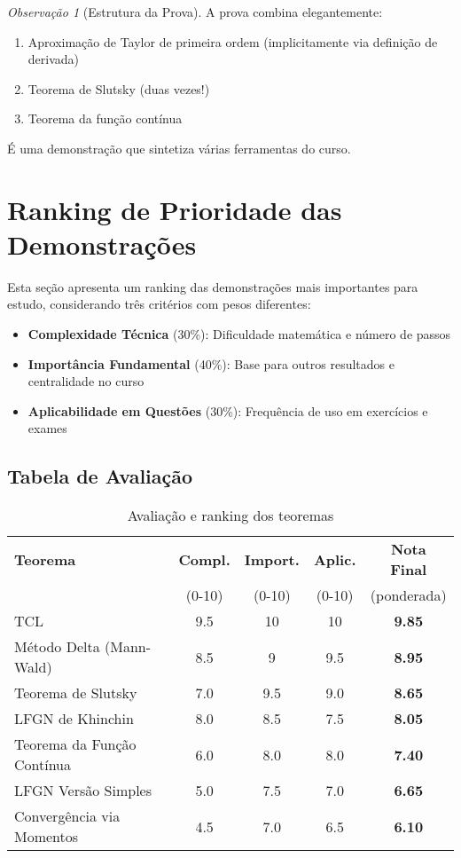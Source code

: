 \documentclass[12pt,a4paper]{article}
\theoremstyle{plain}
\theoremstyle{definition}
\theoremstyle{remark}
\newtheorem{observacao}[teorema]{Observação}
\begin{document}
\begin{observacao}[Estrutura da Prova]
A prova combina elegantemente:
\begin{enumerate}
    \item Aproximação de Taylor de primeira ordem (implicitamente via definição de derivada)
    \item Teorema de Slutsky (duas vezes!)
    \item Teorema da função contínua
\end{enumerate}
É uma demonstração que sintetiza várias ferramentas do curso.
\end{observacao}

\newpage
\section{Ranking de Prioridade das Demonstrações}

Esta seção apresenta um ranking das demonstrações mais importantes para estudo, considerando três critérios com pesos diferentes:
\begin{itemize}
    \item \textbf{Complexidade Técnica} (30\%): Dificuldade matemática e número de passos
    \item \textbf{Importância Fundamental} (40\%): Base para outros resultados e centralidade no curso
    \item \textbf{Aplicabilidade em Questões} (30\%): Frequência de uso em exercícios e exames
\end{itemize}

\subsection{Tabela de Avaliação}

\begin{table}[h]
\centering
\begin{tabular}{|l|c|c|c|c|}
\hline
\textbf{Teorema} & \textbf{Compl.} & \textbf{Import.} & \textbf{Aplic.} & \textbf{Nota Final} \\
 & (0-10) & (0-10) & (0-10) & (ponderada) \\
\hline
TCL & 9.5 & 10 & 10 & \textbf{9.85} \\
\hline
Método Delta (Mann-Wald) & 8.5 & 9 & 9.5 & \textbf{8.95} \\
\hline
Teorema de Slutsky & 7.0 & 9.5 & 9.0 & \textbf{8.65} \\
\hline
LFGN de Khinchin & 8.0 & 8.5 & 7.5 & \textbf{8.05} \\
\hline
Teorema da Função Contínua & 6.0 & 8.0 & 8.0 & \textbf{7.40} \\
\hline
LFGN Versão Simples & 5.0 & 7.5 & 7.0 & \textbf{6.65} \\
\hline
Convergência via Momentos & 4.5 & 7.0 & 6.5 & \textbf{6.10} \\
\hline
\end{tabular}
\caption{Avaliação e ranking dos teoremas}
\end{table}
\end{document}
